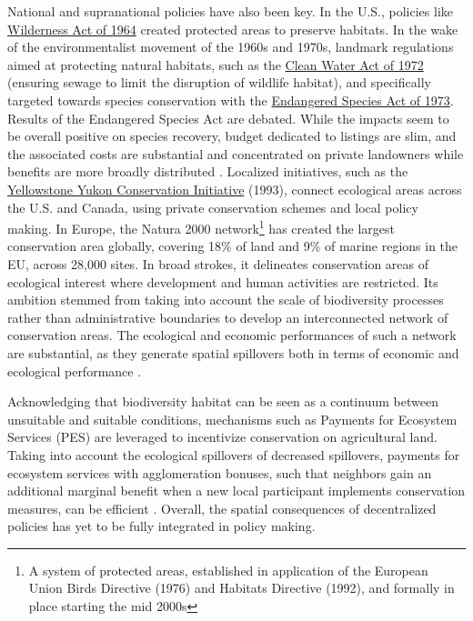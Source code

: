 National and supranational policies have also been key. In the U.S., policies like  \href{https://www.fs.usda.gov/Internet/FSE_DOCUMENTS/fseprd645666.pdf}{Wilderness Act of 1964} created protected areas to preserve habitats. In the wake of the environmentalist movement of the 1960s and 1970s, landmark regulations aimed at protecting natural habitats, such as the \href{https://www.epa.gov/laws-regulations/summary-clean-water-act}{Clean Water Act of 1972} (ensuring sewage to limit the disruption of wildlife habitat), and specifically targeted towards species conservation with the \href{https://www.fws.gov/sites/default/files/documents/endangered-species-act-accessible.pdf}{Endangered Species Act of 1973}. Results of the Endangered Species Act are debated. While the impacts seem to be overall positive on species recovery, budget dedicated to listings are slim, and the associated costs are substantial and concentrated on private landowners while benefits are more broadly distributed \citep{brown_economics_1998, langpap_economics_2018}.
%
Localized initiatives, such as the \href{https://y2y.net/}{Yellowstone Yukon Conservation Initiative} (1993), connect ecological areas across the U.S. and Canada, using private conservation schemes and local policy making. 
%
In Europe, the Natura 2000 network\footnote{A system of protected areas, established in application of the European Union Birds Directive (1976) and Habitats Directive (1992), and formally in place starting the mid 2000s} has created the largest conservation area globally, covering 18\% of land and 9\% of marine regions in the EU, across 28,000 sites. In broad strokes, it delineates conservation areas of ecological interest where development and human activities are restricted. Its ambition stemmed from taking into account the scale of biodiversity processes rather than administrative boundaries to develop an interconnected network of conservation areas. The ecological and economic performances of such a network are substantial, as they generate spatial spillovers both in terms of economic and ecological performance \citep{cocco_relaxing_2023}.

Acknowledging that biodiversity habitat can be seen as a continuum between unsuitable and suitable conditions, mechanisms such as Payments for Ecosystem Services (PES) are leveraged to incentivize conservation on agricultural land. Taking into account the ecological spillovers of decreased spillovers, payments for ecosystem services with agglomeration bonuses, such that neighbors gain an additional marginal benefit when a new local participant implements conservation measures, can be efficient \citep{parkhurst2002agglomeration, bareille_agglomeration_2023}. Overall, the spatial consequences of decentralized policies has yet to be fully integrated in policy making.

